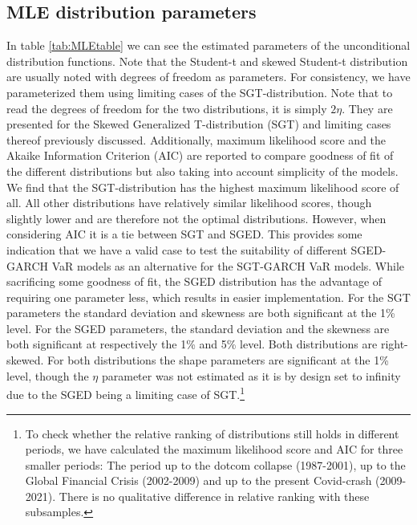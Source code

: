 \documentclass[a4paper, nobind]{templates/ociamthesis}
\begin{document}
\hypertarget{mle-distribution-parameters}{%
\subsection{MLE distribution parameters}\label{mle-distribution-parameters}}

In table \ref{tab:MLEtable} we can see the estimated parameters of the unconditional distribution functions. Note that the Student-t and skewed Student-t distribution are usually noted with degrees of freedom as parameters. For consistency, we have parameterized them using limiting cases of the SGT-distribution. Note that to read the degrees of freedom for the two distributions, it is simply \(2\eta\). They are presented for the Skewed Generalized T-distribution (SGT) and limiting cases thereof previously discussed. Additionally, maximum likelihood score and the Akaike Information Criterion (AIC) are reported to compare goodness of fit of the different distributions but also taking into account simplicity of the models. We find that the SGT-distribution has the highest maximum likelihood score of all. All other distributions have relatively similar likelihood scores, though slightly lower and are therefore not the optimal distributions. However, when considering AIC it is a tie between SGT and SGED. This provides some indication that we have a valid case to test the suitability of different SGED-GARCH VaR models as an alternative for the SGT-GARCH VaR models. While sacrificing some goodness of fit, the SGED distribution has the advantage of requiring one parameter less, which results in easier implementation. For the SGT parameters the standard deviation and skewness are both significant at the 1\% level. For the SGED parameters, the standard deviation and the skewness are both significant at respectively the 1\% and 5\% level. Both distributions are right-skewed. For both distributions the shape parameters are significant at the 1\% level, though the \(\eta\) parameter was not estimated as it is by design set to infinity due to the SGED being a limiting case of SGT.\footnote{To check whether the relative ranking of distributions still holds in different periods, we have calculated the maximum likelihood score and AIC for three smaller periods: The period up to the dotcom collapse (1987-2001), up to the Global Financial Crisis (2002-2009) and up to the present Covid-crash (2009-2021). There is no qualitative difference in relative ranking with these subsamples.} ~\\
\end{document}
